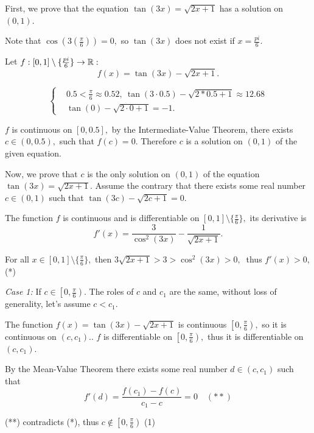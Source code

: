 \documentclass{article}
\begin{document}
\begin{soln}
    First, we prove that the equation $\tan(3x) = \sqrt{2x + 1}$ has a solution on $(0, 1).$
    
    Note that $\cos(3(\frac{\pi}{6})) = 0,$ so $\tan(3x)$ does not exist if $x = \frac{pi}{6}.$

    Let $f: \left[0,  1 \right] \setminus \{ \frac{pi}{6} \} \rightarrow \mathbb R:$
    \[
        f(x) = \tan(3x) - \sqrt{2x + 1}.
    \]

    \[
        \begin{cases}
            &0.5 < \frac{\pi}{6} \approx 0.52,\ \tan(3\cdot 0.5) - \sqrt{2*0.5+1} \approx 12.68\\
            &\tan(0)- \sqrt{2\cdot 0 + 1} = -1.
        \end{cases}
    \]

    $f$ is continuous on $[0, 0.5],$ by the Intermediate-Value Theorem, there exists $c \in (0, 0.5),$ such that $f(c) = 0.$
    Therefore $c$ is a solution on $(0,1)$ of the given equation.

    Now, we prove that $c$ is the only solution on $(0,1)$ of the equation $\tan(3x) = \sqrt{2x + 1}.$
    Assume the contrary that there exists some real number $c \in (0, 1)$ such that $\tan(3c) - \sqrt{2c + 1} = 0.$

    The function $f$ is continuous and is differentiable on $\left[0,  1 \right] \setminus \{ \frac{\pi}{6} \},$ its derivative is 
    \[
        f'(x) = \dfrac{3}{\cos^2(3x)} - \dfrac{1}{\sqrt{2x + 1}}.
    \]

    For all $x \in \left[0,  1 \right] \setminus \{ \frac{\pi}{6} \},$ then $3\sqrt{2x + 1} > 3 > \cos^2(3x) > 0,\ $ thus $f'(x) > 0,$ \quad (*)

    \textit{Case 1:} If $c \in \left[0,  \frac{\pi}{6} \right).$ 
    The roles of $c$ and $c_1$ are the same, without loss of generality, let's assume $c < c_1.$
    
    The function $f(x) = \tan(3x) - \sqrt{2x + 1}$ is continuous $\left[0,  \frac{\pi}{6} \right),$ so it is continuous on $(c, c_1).$.
    $f$ is differentiable on $\left[0,  \frac{\pi}{6} \right),$ thus it is differentiable on $(c, c_1).$

    By the Mean-Value Theorem there exists some real number $d \in (c,c_1)$ such that 
    \[
        f'(d) = \frac{f(c_1) - f(c)}{c_1 - c} = 0 \quad (**)
    \]
    
    (**) contradicts (*), thus $c \not \in \left[0,  \frac{\pi}{6} \right)$ \quad (1)  


\end{soln}
\end{document}
